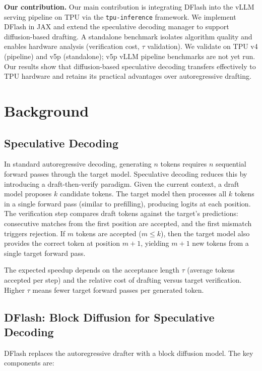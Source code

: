 \documentclass[12pt,letterpaper]{article}
\begin{document}
\textbf{Our contribution.} Our main contribution is integrating DFlash into the vLLM serving pipeline on TPU via the \texttt{tpu-inference} framework. We implement DFlash in JAX and extend the speculative decoding manager to support diffusion-based drafting. A standalone benchmark isolates algorithm quality and enables hardware analysis (verification cost, $\tau$ validation). We validate on TPU v4 (pipeline) and v5p (standalone); v5p vLLM pipeline benchmarks are not yet run. Our results show that diffusion-based speculative decoding transfers effectively to TPU hardware and retains its practical advantages over autoregressive drafting.

\section{Background}

\subsection{Speculative Decoding}

In standard autoregressive decoding, generating $n$ tokens requires $n$ sequential forward passes through the target model. Speculative decoding \citep{leviathan2023fastinferencetransformersspeculative} reduces this by introducing a draft-then-verify paradigm. Given the current context, a draft model proposes $k$ candidate tokens. The target model then processes all $k$ tokens in a single forward pass (similar to prefilling), producing logits at each position. The verification step compares draft tokens against the target's predictions: consecutive matches from the first position are accepted, and the first mismatch triggers rejection. If $m$ tokens are accepted ($m \leq k$), then the target model also provides the correct token at position $m+1$, yielding $m+1$ new tokens from a single target forward pass.

The expected speedup depends on the acceptance length $\tau$ (average tokens accepted per step) and the relative cost of drafting versus target verification. Higher $\tau$ means fewer target forward passes per generated token.

\subsection{DFlash: Block Diffusion for Speculative Decoding}

DFlash \citep{chen2026dflashblockdiffusionflash} replaces the autoregressive drafter with a block diffusion model. The key components are:
\end{document}

